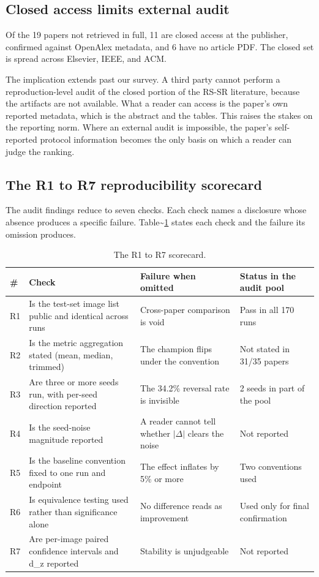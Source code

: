 \documentclass[pdflatex,sn-nature]{sn-jnl}
\newlength{\tblavail}
\begin{document}
\subsection{Closed access limits external audit}\label{sec:closed}

Of the 19 papers not retrieved in full, 11 are closed access at the publisher, confirmed against OpenAlex metadata, and 6 have no article PDF. The closed set is spread across Elsevier, IEEE, and ACM.

The implication extends past our survey. A third party cannot perform a reproduction-level audit of the closed portion of the RS-SR literature, because the artifacts are not available. What a reader can access is the paper's own reported metadata, which is the abstract and the tables. This raises the stakes on the reporting norm. Where an external audit is impossible, the paper's self-reported protocol information becomes the only basis on which a reader can judge the ranking.

\subsection{The R1 to R7 reproducibility scorecard}\label{sec:scorecard}

The audit findings reduce to seven checks. Each check names a disclosure whose absence produces a specific failure. Table\textasciitilde{}\ref{tab:scorecard} states each check and the failure its omission produces.

\begin{table}[htbp]
\centering
\small
\setlength{\tabcolsep}{3pt}
\setlength{\tblavail}{\dimexpr\textwidth-8\tabcolsep\relax}
\begin{tabular}{p{0.038\tblavail}p{0.384\tblavail}p{0.321\tblavail}p{0.227\tblavail}}
\hline
\# & Check & Failure when omitted & Status in the audit pool \\
\hline
R1 & Is the test-set image list public and identical across runs & Cross-paper comparison is void & Pass in all 170 runs \\
R2 & Is the metric aggregation stated (mean, median, trimmed) & The champion flips under the convention & Not stated in 31/35 papers \\
R3 & Are three or more seeds run, with per-seed direction reported & The 34.2\% reversal rate is invisible & 2 seeds in part of the pool \\
R4 & Is the seed-noise magnitude reported & A reader cannot tell whether $|$$\Delta$$|$ clears the noise & Not reported \\
R5 & Is the baseline convention fixed to one run and endpoint & The effect inflates by 5\% or more & Two conventions used \\
R6 & Is equivalence testing used rather than significance alone & No difference reads as improvement & Used only for final confirmation \\
R7 & Are per-image paired confidence intervals and d\_z reported & Stability is unjudgeable & Not reported \\
\hline
\end{tabular}
\caption{The R1 to R7 scorecard.}\label{tab:scorecard}
\end{table}
\end{document}

